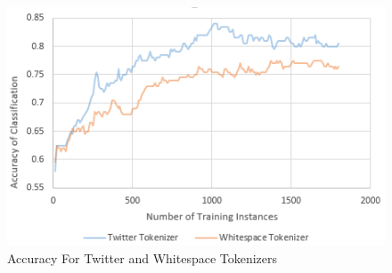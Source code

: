 \documentclass[letterpaper]{article}
\begin{document}
\begin{figure}[ht]
\centering
\includegraphics[width=\linewidth]{chart_twitterVSwhitespace_detailed}
\caption{Accuracy For Twitter and Whitespace Tokenizers}
\label{fig:chart_twitterwhitespace_detailed}
\end{figure}
\end{document}

